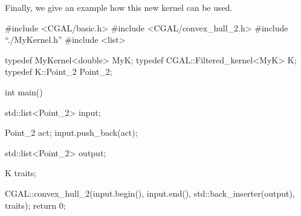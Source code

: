 Finally, we give an example how this new kernel can be used.





\ccHtmlLinksOff


\begin{ccExampleCode}
#include <CGAL/basic.h>
#include <CGAL/convex_hull_2.h>
#include ``./MyKernel.h''
#include <list>

typedef MyKernel<double>           MyK;
typedef CGAL::Filtered_kernel<MyK> K;
typedef K::Point_2                 Point_2;

int main()
{
  std::list<Point_2> input;
  
  Point_2 act;
  input.push_back(act);

  std::list<Point_2> output;

  K  traits;

  CGAL::convex_hull_2(input.begin(), input.end(),
                      std::back_inserter(output), traits);		        
  return 0;
}
\end{ccExampleCode}

\ccHtmlLinksOn


